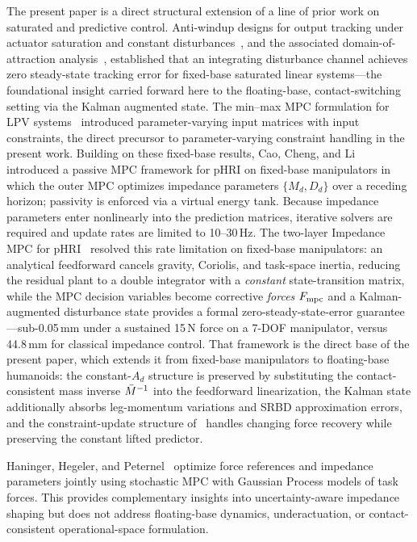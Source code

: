 The present paper is a direct structural extension of a line of prior
work on saturated and predictive control.
Anti-windup designs for output tracking under actuator saturation and
constant disturbances~\cite{cao2004antiwindup}, and the associated
domain-of-attraction analysis~\cite{cao2002antiwindup}, established that an
integrating disturbance channel achieves zero steady-state tracking error
for fixed-base saturated linear systems---the foundational insight carried
forward here to the floating-base, contact-switching setting via the Kalman
augmented state.
The min--max MPC formulation for LPV systems~\cite{cao2005minmax} introduced
parameter-varying input matrices with input constraints, the direct
precursor to parameter-varying constraint handling in the present
work.
Building on these fixed-base results, Cao, Cheng, and
Li~\cite{cao2023passive} introduced a passive MPC framework for pHRI on
fixed-base manipulators in which the outer MPC optimizes impedance
parameters $\{M_d,D_d\}$ over a receding horizon; passivity is enforced via
a virtual energy tank.
Because impedance parameters enter nonlinearly into the prediction matrices,
iterative solvers are required and update rates are limited to 10--30\,Hz.
The two-layer Impedance MPC for pHRI~\cite{cao2026impedance} resolved this
rate limitation on fixed-base manipulators: an analytical feedforward
cancels gravity, Coriolis, and task-space inertia, reducing the residual
plant to a double integrator with a \emph{constant} state-transition
matrix, while the MPC decision variables become corrective \emph{forces}
$F_{\text{mpc}}$ and a Kalman-augmented disturbance state provides a formal
zero-steady-state-error guarantee---sub-0.05\,mm under a sustained 15\,N
force on a 7-DOF manipulator, versus 44.8\,mm for classical impedance
control.
That framework is the direct base of the present paper, which extends it
from fixed-base manipulators to floating-base humanoids: the constant-$A_d$
structure is preserved by substituting the contact-consistent mass inverse
$\bar{M}^{-1}$ into the feedforward linearization, the Kalman state additionally
absorbs leg-momentum variations and SRBD approximation errors, and the
constraint-update structure of~\cite{cao2005minmax} handles changing force
recovery while preserving the constant lifted predictor.

Haninger, Hegeler, and Peternel~\cite{haninger2022model} optimize force
references and impedance parameters jointly using stochastic MPC with
Gaussian Process models of task forces.
This provides complementary insights into uncertainty-aware impedance
shaping but does not address floating-base dynamics, underactuation, or
contact-consistent operational-space formulation.

